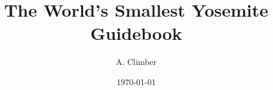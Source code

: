 \title{The World's Smallest Yosemite Guidebook}
\author{A. Climber}
\date{\today}
\def\publisher{Jolly Roger Press}
\def\publisherlogo{jr_press.png}
\def\bookedition{First}
\def\coverimage{}
\def\backcoverimage{}
\def\heightunit{'}
